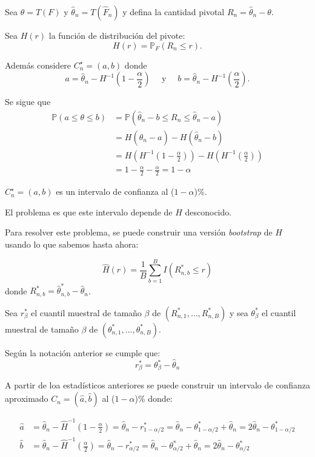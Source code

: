 \documentclass[
  12pt,
]{book}
\begin{document}
Sea \(\theta=T(F)\) y
\(\widehat{\theta}_{n}=T\left(\widehat{F}_{n}\right)\) y defina la
cantidad pivotal \(R_{n}=\widehat{\theta}_{n}-\theta .\)

Sea \(H(r)\) la función de distribución del pivote: \[
H(r)=\mathbb{P}_{F}\left(R_{n} \leq r\right).
\]

Además considere \(C_{n}^{\star}=(a, b)\) donde \[
a=\widehat{\theta}_{n}-H^{-1}\left(1-\frac{\alpha}{2}\right) \quad \text { y } \quad b=\widehat{\theta}_{n}-H^{-1}\left(\frac{\alpha}{2}\right).
\]

Se sigue que \begin{align*}
\mathbb{P}(a \leq \theta \leq b)
&=\mathbb{P}\left(\widehat{\theta}_{n}-b \leq R_{n} \leq \widehat{\theta}_{n}-a\right) \\
&=H\left(\widehat{\theta}_{n}-a\right)-H\left(\widehat{\theta}_{n}-b\right) \\
&=H\left(H^{-1}\left(1-\frac{\alpha}{2}\right)\right)-H\left(H^{-1}\left(\frac{\alpha}{2}\right)\right) \\
&=1-\frac{\alpha}{2}-\frac{\alpha}{2}=1-\alpha
\end{align*}

\(C_{n}^{\star}=(a, b)\) es un intervalo de confianza al
(\(1-\alpha\))\%.

El problema es que este intervalo depende de \(H\) desconocido.

Para resolver este problema, se puede construir una versión
\emph{bootstrap} de \(H\) usando lo que sabemos hasta ahora:

\[
\widehat{H}(r)=\frac{1}{B} \sum_{b=1}^{B} I\left(R_{n, b}^{*} \leq r\right)
\] donde
\(R_{n, b}^{*}=\widehat{\theta}_{n, b}^{*}-\widehat{\theta}_{n}\).

Sea \(r_{\beta}^{*}\) el cuantil muestral de tamaño \(\beta\) de
\(\left(R_{n, 1}^{*}, \ldots, R_{n, B}^{*}\right)\) y sea
\(\theta_{\beta}^{*}\) el cuantil muestral de tamaño \(\beta\) de
\(\left(\theta_{n, 1}^{*}, \ldots, \theta_{n, B}^{*}\right)\).

Según la notación anterior se cumple que: \begin{equation*}
r_{\beta}^{*}= \theta_{\beta}^{*}-\widehat{\theta}_{n}
\end{equation*}

A partir de loa estadísticos anteriores se puede construir un intervalo
de confianza aproximado \(C_{n}=(\widehat{a}, \widehat{b})\) al
(\(1-\alpha\))\% donde:

\begin{align*}
\widehat{a}&= \widehat{\theta}_{n}-\widehat{H}^{-1}\left(1-\frac{\alpha}{2}\right) = \widehat{\theta}_{n}-r_{1-\alpha / 2}^{*} = \widehat{\theta}_{n}-\theta_{1-\alpha / 2}^{*} + \widehat{\theta}_{n} =2 \widehat{\theta}_{n}-\theta_{1-\alpha / 2}^{*} \\
\widehat{b} &=\widehat{\theta}_{n}-\widehat{H}^{-1}\left(\frac{\alpha}{2}\right)
=\widehat{\theta}_{n}-r_{\alpha / 2}^{*}
= \widehat{\theta}_{n}-\theta_{\alpha / 2}^{*} + \widehat{\theta}_{n}
=2 \widehat{\theta}_{n}-\theta_{\alpha / 2}^{*}
\end{align*}
\end{document}
